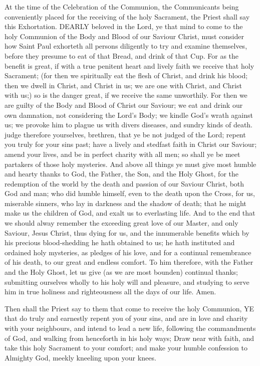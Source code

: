 At the time of the Celebration of the Communion, the Communicants being conveniently placed for the receiving of the holy Sacrament, the Priest shall say this Exhortation.
DEARLY beloved in the Lord, ye that mind to come to the holy Communion of the Body and Blood of our Saviour Christ, must consider how Saint Paul exhorteth all persons diligently to try and examine themselves, before they presume to eat of that Bread, and drink of that Cup. For as the benefit is great, if with a true penitent heart and lively faith we receive that holy Sacrament; (for then we spiritually eat the flesh of Christ, and drink his blood; then we dwell in Christ, and Christ in us; we are one with Christ, and Christ with us;) so is the danger great, if we receive the same unworthily. For then we are guilty of the Body and Blood of Christ our Saviour; we eat and drink our own damnation, not considering the Lord's Body; we kindle God's wrath against us; we provoke him to plague us with divers diseases, and sundry kinds of death. judge therefore yourselves, brethren, that ye be not judged of the Lord; repent you truly for your sins past; have a lively and stedfast faith in Christ our Saviour; amend your lives, and be in perfect charity with all men; so shall ye be meet partakers of those holy mysteries. And above all things ye must give most humble and hearty thanks to God, the Father, the Son, and the Holy Ghost, for the redemption of the world by the death and passion of our Saviour Christ, both God and man; who did humble himself, even to the death upon the Cross, for us, miserable sinners, who lay in darkness and the shadow of death; that he might make us the children of God, and exalt us to everlasting life. And to the end that we should alway remember the exceeding great love of our Master, and only Saviour, Jesus Christ, thus dying for us, and the innumerable benefits which by his precious blood-shedding he hath obtained to us; he hath instituted and ordained holy mysteries, as pledges of his love, and for a continual remembrance of his death, to our great and endless comfort. To him therefore, with the Father and the Holy Ghost, let us give (as we are most bounden) continual thanks; submitting ourselves wholly to his holy will and pleasure, and studying to serve him in true holiness and righteousness all the days of our life. Amen.

Then shall the Priest say to them that come to receive the holy Communion,
YE that do truly and earnestly repent you of your sins, and are in love and charity with your neighbours, and intend to lead a new life, following the commandments of God, and walking from henceforth in his holy ways; Draw near with faith, and take this holy Sacrament to your comfort; and make your humble confession to Almighty God, meekly kneeling upon your knees.

